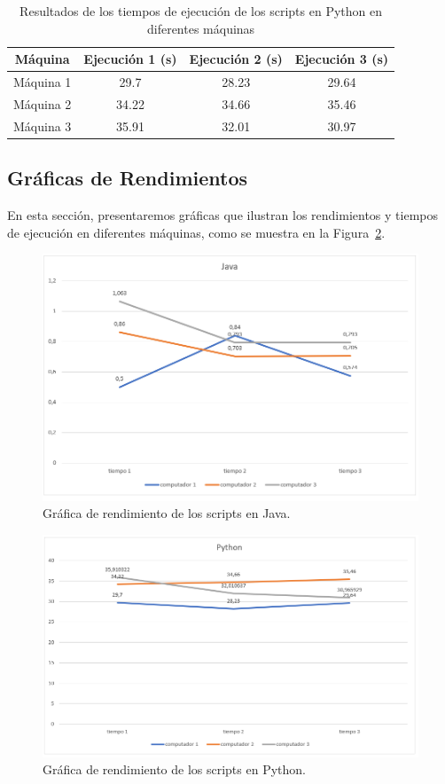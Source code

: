 \documentclass[conference]{IEEEtran}
\begin{document}
\begin{table}[ht]
\caption{Resultados de los tiempos de ejecución de los scripts en Python en diferentes máquinas}
\label{tab:resultados-python}
\centering
\begin{tabular}{c|S[table-format=2.2]S[table-format=2.2]S[table-format=2.6]}
\toprule
Máquina & {Ejecución 1 (s)} & {Ejecución 2 (s)} & {Ejecución 3 (s)} \\
\midrule
Máquina 1 & 29.7 & 28.23 & 29.64 \\
Máquina 2 & 34.22 & 34.66 & 35.46 \\
Máquina 3 & 35.91 & 32.01 & 30.97 \\
\bottomrule
\end{tabular}
\end{table}

\subsection{Gráficas de Rendimientos}

En esta sección, presentaremos gráficas que ilustran los rendimientos y tiempos de ejecución en diferentes máquinas, como se muestra en la Figura~\ref{fig:grafica-rendimiento}.

\begin{figure}[ht]
\centering
\includegraphics[width=0.8\linewidth]{java.png}
\caption{Gráfica de rendimiento de los scripts en Java.}
\label{fig:grafica-rendimiento}
\end{figure}
\begin{figure}[ht]
\centering
\includegraphics[width=0.8\linewidth]{Python.png}
\caption{Gráfica de rendimiento de los scripts en Python.}
\label{fig:grafica-rendimiento}
\end{figure}
\end{document}

